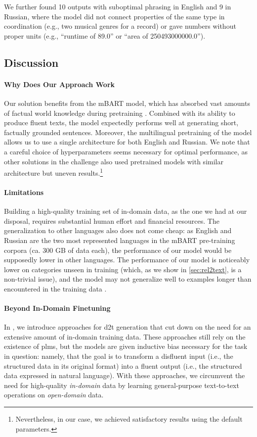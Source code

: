We further found 10 outputs with suboptimal phrasing in English and 9 in Russian, where the model did not connect properties of the same type in coordination (e.g., two musical genres for a record) or gave numbers without proper units (e.g., ``runtime of 89.0'' or ``area of 250493000000.0'').

\subsection{Discussion}
\paragraph{Why Does Our Approach Work} Our solution benefits from the mBART model, which has absorbed vast amounts of factual world knowledge during pretraining \cite{petroni2019language}. Combined with its ability to produce fluent texts, the model expectedly performs well at generating short, factually grounded sentences. Moreover, the multilingual pretraining of the model allows us to use a single architecture for both English and Russian. We note that a careful choice of hyperparameters seems necessary for optimal performance, as other solutions in the challenge also used pretrained models with similar architecture but uneven results.\footnote{Nevertheless, in our case, we achieved satisfactory results using the default parameters.}

\paragraph{Limitations} Building a high-quality training set of in-domain data, as the one we had at our disposal, requires substantial human effort and financial resources. The generalization to other languages also does not come cheap: as English and Russian are the two most represented languages in the mBART pre-training corpora (ca. 300 GB of data each), the performance of our model would be supposedly lower in other languages. The performance of our model is noticeably lower on categories unseen in training (which, as we show in \autoref{sec:rel2text}, is a non-trivial issue), and the model may not generalize well to examples longer than encountered in the training data \cite{zhouWhatAlgorithmsCan2023,xuCompositionalGeneralizationDatatoText2023}.


\paragraph{Beyond In-Domain Finetuning} In , we introduce approaches for \ac{d2t} generation that cut down on the need for an extensive amount of in-domain training data. These approaches still rely on the existence of \acp{plm}, but the models are given inductive bias necessary for the task in question: namely, that the goal is to transform a disfluent input (i.e., the structured data in its original format) into a fluent output (i.e., the structured data expressed in natural language). With these approaches, we circumvent the need for high-quality \emph{in-domain} data by learning general-purpose text-to-text operations on \emph{open-domain} data.



